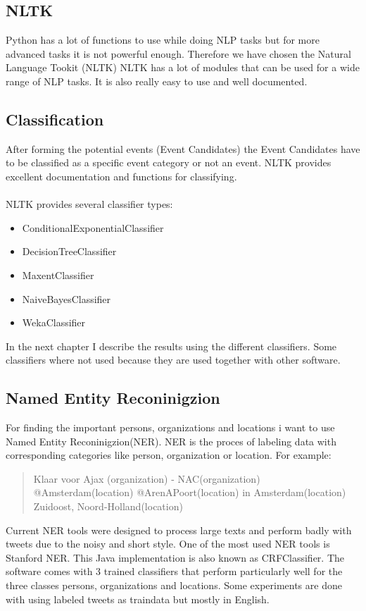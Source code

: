 \documentclass[
10pt, %
a4paper, %
oneside, %
headinclude,footinclude, %
BCOR5mm, %
]{scrartcl}
\begin{document}
\subsection{NLTK}
Python has a lot of functions to use while doing NLP tasks but for more advanced tasks it is not powerful enough. Therefore we have chosen the Natural Language Tookit (NLTK) %
NLTK has a lot of modules that can be used for a wide range of NLP tasks. It is also really easy to use and well documented. 

\subsection{Classification}
After forming the potential events (Event Candidates) the Event Candidates have to be classified as a specific event category or not an event.  NLTK provides excellent documentation and functions for classifying. \\\\  NLTK provides several classifier types:

\begin{itemize}[noitemsep]
\item ConditionalExponentialClassifier
\item DecisionTreeClassifier
\item MaxentClassifier
\item NaiveBayesClassifier
\item WekaClassifier
\end{itemize}

In the next chapter I describe the results using the different classifiers. Some classifiers where not used because they are used together with other software.


\subsection{Named Entity Reconinigzion}
For finding the important persons, organizations and locations i want to use Named Entity Reconinigzion(NER). NER is the proces of labeling data with corresponding categories like person, organization or location. For example:

\begin {quote}
Klaar voor Ajax (organization) - NAC(organization) @Amsterdam(location) @ArenAPoort(location) in Amsterdam(location) Zuidoost, Noord-Holland(location)
\end{quote}
Current NER tools were designed to process large texts and perform badly with tweets due to the noisy and short style. One of the most used NER tools is Stanford NER. This Java implementation is also known as CRFClassifier. The software comes with 3 trained classifiers that perform particularly well for the three classes persons, organizations and locations. Some experiments are done with using labeled tweets as traindata but mostly in English.  
\end{document}
